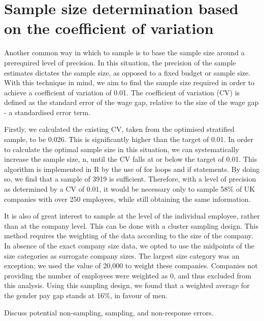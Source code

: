 \documentclass[]{article}
\begin{document}
\section{Sample size determination based on the coefficient of
variation}\label{sample-size-determination-based-on-the-coefficient-of-variation}

Another common way in which to sample is to base the sample size around
a prerequired level of precision. In this situation, the precision of
the sample estimates dictates the sample size, as opposed to a fixed
budget or sample size. With this technique in mind, we aim to find the
sample size required in order to achieve a coefficient of variation of
0.01. The coefficient of variation (CV) is defined as the standard error
of the wage gap, relative to the size of the wage gap - a standardised
error term.

Firstly, we calculated the existing CV, taken from the optimised
stratified sample, to be 0.026. This is significantly higher than the
target of 0.01. In order to calculate the optimal sample size in this
situation, we can systematically increase the sample size, n, until the
CV falls at or below the target of 0.01. This algorithm is implemented
in R by the use of for loops and if statements. By doing so, we find
that a sample of 3919 is sufficient. Therefore, with a level of
precision as determined by a CV of 0.01, it would be necessary only to
sample 58\% of UK companies with over 250 employees, while still
obtaining the same information.

It is also of great interest to sample at the level of the individual
employee, rather than at the company level. This can be done with a
cluster sampling design. This method requires the weighting of the data
according to the size of the company. In absence of the exact company
size data, we opted to use the midpoints of the size categories as
surrogate company sizes. The largest size category was an exception; we
used the value of 20,000 to weight these companies. Companies not
providing the number of employees were weighted as 0, and thus excluded
from this analysis. Using this sampling design, we found that a weighted
average for the gender pay gap stands at 16\%, in favour of men.

Discuss potential non-sampling, sampling, and non-response errors.
\end{document}
